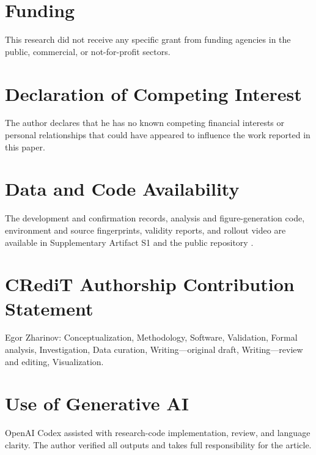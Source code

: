 \documentclass[letterpaper,10pt,conference]{IEEEtran}
\begin{document}
\section*{Funding}
This research did not receive any specific grant from funding agencies in the
public, commercial, or not-for-profit sectors.

\section*{Declaration of Competing Interest}
The author declares that he has no known competing financial interests or
personal relationships that could have appeared to influence the work reported
in this paper.

\section*{Data and Code Availability}
The development and confirmation records, analysis and figure-generation code,
environment and source fingerprints, validity reports, and rollout video are
available in Supplementary Artifact S1 and the public repository
\cite{zharinov2026repository}.

\section*{CRediT Authorship Contribution Statement}
Egor Zharinov: Conceptualization, Methodology, Software, Validation, Formal
analysis, Investigation, Data curation, Writing---original draft,
Writing---review and editing, Visualization.

\section*{Use of Generative AI}
OpenAI Codex assisted with research-code implementation, review, and language
clarity. The author verified all outputs and takes full responsibility for the
article.



\end{document}
